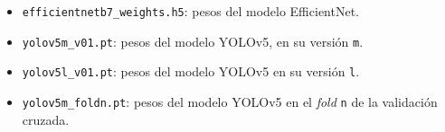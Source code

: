 \begin{itemize}
    \item \texttt{efficientnetb7\_weights.h5}: pesos del modelo EfficientNet.
    \item \texttt{yolov5m\_v01.pt}: pesos del modelo YOLOv5, en su versión \texttt{m}.
    \item \texttt{yolov5l\_v01.pt}: pesos del modelo YOLOv5 en su versión \texttt{l}.
    \item \texttt{yolov5m\_foldn.pt}: pesos del modelo YOLOv5 en el \textit{fold} \texttt{n} de la validación cruzada.
\end{itemize}

